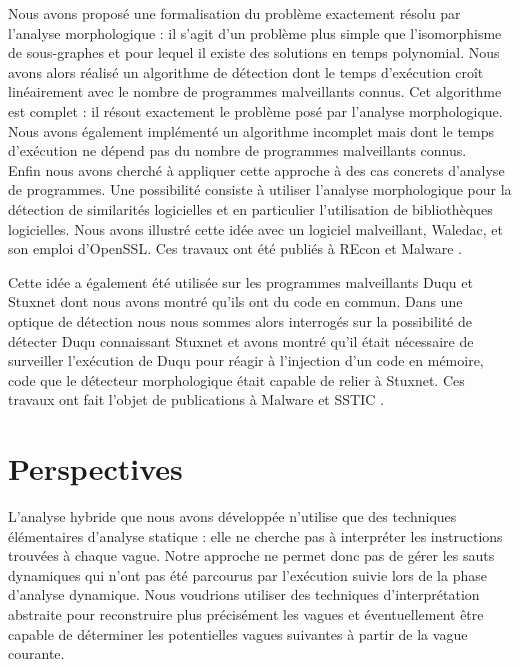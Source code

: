 Nous avons proposé une formalisation du problème exactement résolu par l'analyse morphologique : il s'agit d'un problème plus simple que l'isomorphisme de sous-graphes et pour lequel il existe des solutions en temps polynomial.
Nous avons alors réalisé un algorithme de détection dont le temps d'exécution croît linéairement avec le nombre de programmes malveillants connus. Cet algorithme est complet : il résout exactement le problème posé par l'analyse morphologique.
Nous avons également implémenté un algorithme incomplet mais dont le temps d'exécution ne dépend pas du nombre de programmes malveillants connus.
\\

Enfin nous avons cherché à appliquer cette approche à des cas concrets d'analyse de programmes.
Une possibilité consiste à utiliser l'analyse morphologique pour la détection de similarités logicielles et en particulier l'utilisation de bibliothèques logicielles.
Nous avons illustré cette idée avec un logiciel malveillant, Waledac, et son emploi d'OpenSSL.
Ces travaux ont été publiés à REcon \cite{REAT12} et Malware \cite{mal12}.

Cette idée a également été utilisée sur les programmes malveillants Duqu et Stuxnet dont nous avons montré qu'ils ont du code en commun.
Dans une optique de détection nous nous sommes alors interrogés sur la possibilité de détecter Duqu connaissant Stuxnet et avons montré qu'il était nécessaire de surveiller l'exécution de Duqu pour réagir à l'injection d'un code en mémoire, code que le détecteur morphologique était capable de relier à Stuxnet.
Ces travaux ont fait l'objet de publications à Malware \cite{mal13} et SSTIC \cite{sstic13}.







\section*{Perspectives}
L'analyse hybride que nous avons développée n'utilise que des techniques élémentaires d'analyse statique :
elle ne cherche pas à interpréter les instructions trouvées à chaque vague. 
Notre approche ne permet donc pas de gérer les sauts dynamiques qui n'ont pas été parcourus par l'exécution suivie lors de la phase d'analyse dynamique.
Nous voudrions utiliser des techniques d’interprétation abstraite pour reconstruire plus précisément les vagues et éventuellement être capable de déterminer les potentielles vagues suivantes à partir de la vague courante.

